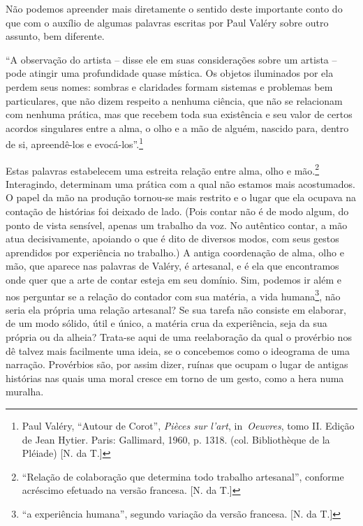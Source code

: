 Não podemos apreender mais diretamente o sentido deste importante conto
do que com o auxílio de algumas palavras escritas por Paul Valéry sobre
outro assunto, bem diferente.

``A observação do artista -- disse ele em suas considerações sobre um
artista -- pode atingir uma profundidade quase mística. Os objetos
iluminados por ela perdem seus nomes: sombras e claridades formam
sistemas e problemas bem particulares, que não dizem respeito a nenhuma
ciência, que não se relacionam com nenhuma prática, mas que recebem toda
sua existência e seu valor de certos acordos singulares entre a alma, o
olho e a mão de alguém, nascido para, dentro de si, apreendê-los e
evocá-los''.\footnote{Paul Valéry, ``Autour de Corot'', \emph{Pièces sur
  l'art}, in~\emph{Oeuvres}, tomo II. Edição de Jean Hytier. Paris:
  Gallimard, 1960, p. 1318. (col. Bibliothèque de la Pléiade) {[}N. da
  T.{]}}

Estas palavras estabelecem uma estreita relação entre alma, olho e
mão.\footnote{``Relação de colaboração que determina todo trabalho
  artesanal'', conforme acréscimo efetuado na versão francesa. {[}N. da
  T.{]}} Interagindo, determinam uma prática com a qual não estamos mais
acostumados. O papel da mão na produção tornou-se mais restrito e o
lugar que ela ocupava na contação de histórias foi deixado de lado.
(Pois contar não é de modo algum, do ponto de vista sensível, apenas um
trabalho da voz. No autêntico contar, a mão atua decisivamente, apoiando
o que é dito de diversos modos, com seus gestos aprendidos por
experiência no trabalho.) A antiga coordenação de alma, olho e mão, que
aparece nas palavras de Valéry, é artesanal, e é ela que encontramos
onde quer que a arte de contar esteja em seu domínio. Sim, podemos ir
além e nos perguntar se a relação do contador com sua matéria, a vida
humana\footnote{``a experiência humana'', segundo variação da versão
  francesa. {[}N. da T.{]}}, não seria ela própria uma relação
artesanal? Se sua tarefa não consiste em elaborar, de um modo sólido,
útil e único, a matéria crua da experiência, seja da sua própria ou da
alheia? Trata-se aqui de uma reelaboração da qual o provérbio nos dê
talvez mais facilmente uma ideia, se o concebemos como o ideograma de
uma narração. Provérbios são, por assim dizer, ruínas que ocupam o lugar
de antigas histórias nas quais uma moral cresce em torno de um gesto,
como a hera numa muralha.

